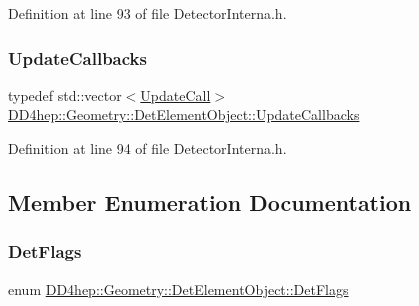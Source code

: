 Definition at line 93 of file Detector\+Interna.\+h.

\hypertarget{class_d_d4hep_1_1_geometry_1_1_det_element_object_aa3bda3e351cc13f5bcce906a67d21872}{}\label{class_d_d4hep_1_1_geometry_1_1_det_element_object_aa3bda3e351cc13f5bcce906a67d21872} 
\subsubsection{\texorpdfstring{Update\+Callbacks}{UpdateCallbacks}}
{\footnotesize\ttfamily typedef std\+::vector$<$\hyperlink{class_d_d4hep_1_1_geometry_1_1_det_element_object_a3b316c36c1b168152e4c96a42ca561aa}{Update\+Call}$>$ \hyperlink{class_d_d4hep_1_1_geometry_1_1_det_element_object_aa3bda3e351cc13f5bcce906a67d21872}{D\+D4hep\+::\+Geometry\+::\+Det\+Element\+Object\+::\+Update\+Callbacks}}



Definition at line 94 of file Detector\+Interna.\+h.



\subsection{Member Enumeration Documentation}
\hypertarget{class_d_d4hep_1_1_geometry_1_1_det_element_object_a04115ec0fa8d9df9b7d47ed45e9b037d}{}\label{class_d_d4hep_1_1_geometry_1_1_det_element_object_a04115ec0fa8d9df9b7d47ed45e9b037d} 
\subsubsection{\texorpdfstring{Det\+Flags}{DetFlags}}
{\footnotesize\ttfamily enum \hyperlink{class_d_d4hep_1_1_geometry_1_1_det_element_object_a04115ec0fa8d9df9b7d47ed45e9b037d}{D\+D4hep\+::\+Geometry\+::\+Det\+Element\+Object\+::\+Det\+Flags}}

